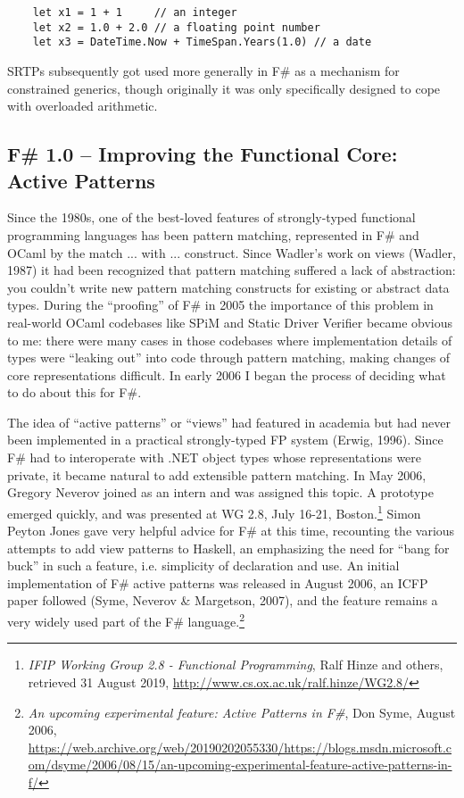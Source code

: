 \documentclass[acmsmall,review]{acmart}\settopmatter{printfolios=true,printccs=false,printacmref=false}
\begin{document}
\begin{verbatim}
    let x1 = 1 + 1     // an integer
    let x2 = 1.0 + 2.0 // a floating point number
    let x3 = DateTime.Now + TimeSpan.Years(1.0) // a date
\end{verbatim}

SRTPs subsequently got used more generally in F\# as a mechanism for constrained generics, though originally it was only specifically designed to cope with overloaded arithmetic.


\subsection*{F\# 1.0 – Improving the Functional Core: Active Patterns}

Since the 1980s, one of the best-loved features of strongly-typed functional programming languages has been pattern matching, represented in F\# and OCaml by the match ... with ... construct. Since Wadler’s work on views (Wadler, 1987) it had been recognized that pattern matching suffered a lack of abstraction: you couldn’t write new pattern matching constructs for existing or abstract data types.  During the “proofing” of F\# in 2005 the importance of this problem in real-world OCaml codebases like SPiM and Static Driver Verifier became obvious to me: there were many cases in those codebases where implementation details of types were “leaking out” into code through pattern matching, making changes of core representations difficult.  In early 2006 I began the process of deciding what to do about this for F\#.  

The idea of “active patterns” or “views” had featured in academia but had never been implemented in a practical strongly-typed FP system (Erwig, 1996).  Since F\# had to interoperate with .NET object types whose representations were private, it became natural to add extensible pattern matching. In May 2006, Gregory Neverov joined as an intern and was assigned this topic.  A prototype emerged quickly, and was presented at WG 2.8, July 16-21, Boston.\footnote{\textit{IFIP Working Group 2.8 - Functional Programming}, Ralf Hinze and others, retrieved 31 August 2019, \url{http://www.cs.ox.ac.uk/ralf.hinze/WG2.8/}}  Simon Peyton Jones gave very helpful advice for F\# at this time, recounting the various attempts to add view patterns to Haskell, an emphasizing the need for “bang for buck” in such a feature, i.e. simplicity of declaration and use. An initial implementation of F\# active patterns was released in August 2006, an ICFP paper followed (Syme, Neverov \& Margetson, 2007), and the feature remains a very widely used part of the F\# language.\footnote{\textit{An upcoming experimental feature: Active Patterns in F\#}, Don Syme, August 2006, \url{https://web.archive.org/web/20190202055330/https://blogs.msdn.microsoft.com/dsyme/2006/08/15/an-upcoming-experimental-feature-active-patterns-in-f/}}
\end{document}
